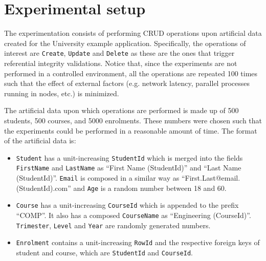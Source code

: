 \section{Experimental setup}\label{sexp:ExperimentalSetup}



The experimentation consists of performing \ac{CRUD} operations upon artificial
data created for the University example application. Specifically, the
operations of interest are \texttt{Create}, \texttt{Update} and \texttt{Delete}
as these are the ones that trigger referential integrity validations. Notice
that, since the experiments are not performed in a controlled environment, all
the operations are repeated 100 times such that the effect of external factors
(e.g. network latency, parallel processes running in nodes, etc.)  is minimized.

 
 The artificial data upon which operations are performed  is made up of 500
 students, 500 courses, and 5000 enrolments. These numbers were chosen such that
 the experiments could be performed in a reasonable amount of time. 
 The format of the artificial data is:

	\begin{itemize}
		  \item \texttt{Student} has a
		unit-increasing \texttt{StudentId}  which is merged into the fields \texttt{FirstName}
		 and \texttt{LastName} as ``First Name (StudentId)'' and ``Last Name
		(StudentId)''.  \texttt{Email} is composed in a similar way as
		``First.Last@email.(StudentId).com'' and \texttt{Age} is a random number
		between 18 and 60.
		
		\item  \texttt{Course} has a unit-increasing \texttt{CourseId} which is
		appended to the prefix ``COMP''.  It also has a composed \texttt{CourseName}
		as ``Engineering (CourseId)''.  \texttt{Trimester}, \texttt{Level}
		and \texttt{Year} are randomly generated numbers.
		
		\item  \texttt{Enrolment} contains a unit-increasing \texttt{RowId}  and the
		respective foreign keys of student and course,  which are \texttt{StudentId}
		and \texttt{CourseId}. 
	\end{itemize}
 
